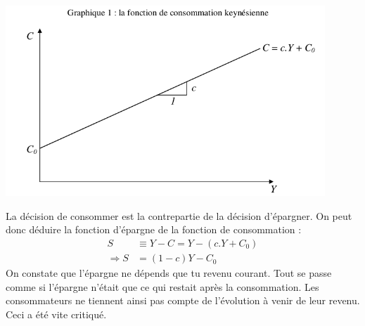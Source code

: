 \documentclass[10pt]{book}
\begin{document}
\begin{center}
  \includegraphics[width=12cm]{graph11.png}
\end{center}
La décision de consommer est la contrepartie de la décision d'épargner. On peut donc déduire la fonction d'épargne de la fonction de consommation : 
\begin{align*}
  S & \equiv Y - C = Y - (c.Y + C_0) \\
  \Rightarrow S & = (1 - c) Y - C_0
\end{align*}
On constate que l'épargne ne dépends que tu revenu courant. Tout se passe comme si l'épargne n'était que ce qui restait après la consommation. Les consommateurs ne tiennent ainsi pas compte de l'évolution à venir de leur revenu. Ceci a été vite critiqué.
\end{document}
